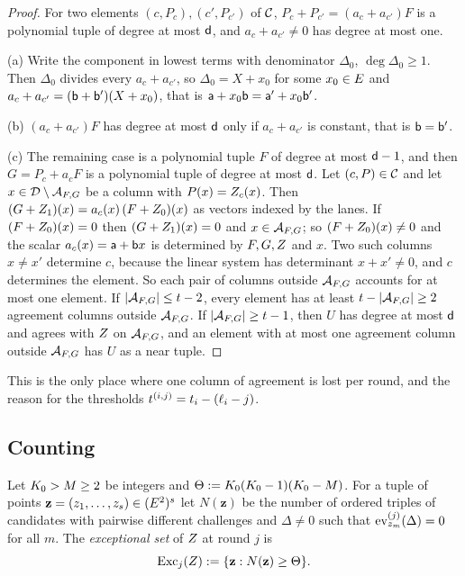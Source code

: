 \begin{proof}
For two elements $(c,P_c),(c',P_{c'})$ of $\mathcal{C}$, $P_c+P_{c'}=(a_c+a_{c'})F$ is a polynomial tuple of degree at most $\mathsf{d}$, and $a_c+a_{c'}\ne0$ has degree at most one.

(a) Write the component in lowest terms with denominator $\Delta_0$, $\deg\Delta_0\ge1$. Then $\Delta_0$ divides every $a_c+a_{c'}$, so $\Delta_0=X+x_0$ for some $x_0\in E$ and $a_c+a_{c'}=(\mathsf{b}+\mathsf{b}')(X+x_0)$, that is $\mathsf{a}+x_0\mathsf{b}=\mathsf{a}'+x_0\mathsf{b}'$.

(b) $(a_c+a_{c'})F$ has degree at most $\mathsf{d}$ only if $a_c+a_{c'}$ is constant, that is $\mathsf{b}=\mathsf{b}'$.

(c) The remaining case is a polynomial tuple $F$ of degree at most $\mathsf{d}-1$, and then $G=P_c+a_cF$ is a polynomial tuple of degree at most $\mathsf{d}$. Let $(c,P)\in\mathcal{C}$ and let $x\in\mathcal{D}\setminus\mathcal{A}_{F,G}$ be a column with $P(x)=Z_c(x)$. Then $(G+Z_1)(x)=a_c(x)\,(F+Z_0)(x)$ as vectors indexed by the lanes. If $(F+Z_0)(x)=0$ then $(G+Z_1)(x)=0$ and $x\in\mathcal{A}_{F,G}$; so $(F+Z_0)(x)\ne0$ and the scalar $a_c(x)=\mathsf{a}+\mathsf{b} x$ is determined by $F,G,Z$ and $x$. Two such columns $x\ne x'$ determine $c$, because the linear system has determinant $x+x'\ne0$, and $c$ determines the element. So each pair of columns outside $\mathcal{A}_{F,G}$ accounts for at most one element. If $|\mathcal{A}_{F,G}|\le t-2$, every element has at least $t-|\mathcal{A}_{F,G}|\ge2$ agreement columns outside $\mathcal{A}_{F,G}$. If $|\mathcal{A}_{F,G}|\ge t-1$, then $U$ has degree at most $\mathsf{d}$ and agrees with $Z$ on $\mathcal{A}_{F,G}$, and an element with at most one agreement column outside $\mathcal{A}_{F,G}$ has $U$ as a near tuple.
\end{proof}

This is the only place where one column of agreement is lost per round, and the reason for the thresholds $t^{(i,j)}=t_i-(\ell_i-j)$.

\subsection{Counting}\label{sec:counting}

\begin{definition}\label{def:exc}
Let $K_0>M\ge2$ be integers and $\Theta:=K_0(K_0-1)(K_0-M)$. For a tuple of points $\mathbf z=(z_1,\dots,z_s)\in(E^2)^s$ let $N(\mathbf z)$ be the number of ordered triples of candidates with pairwise different challenges and $\Delta\ne0$ such that $\operatorname{ev}^{(j)}_{z_m}(\Delta)=0$ for all $m$. The \emph{exceptional set} of $Z$ at round $j$ is
\[
\operatorname{Exc}_j(Z):=\{\mathbf z:N(\mathbf z)\ge\Theta\}.
\]
\end{definition}

